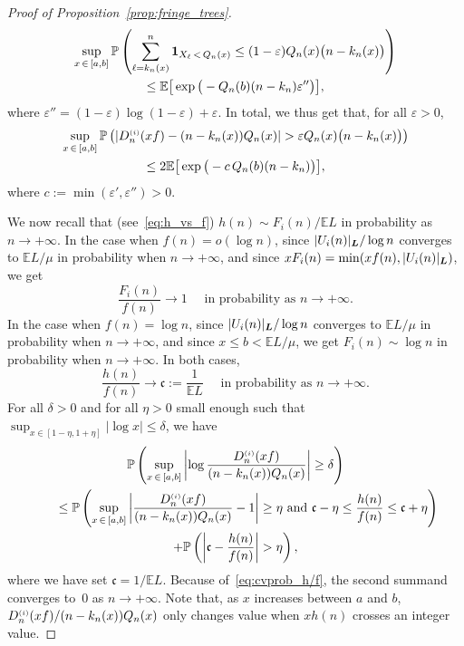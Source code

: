 \documentclass[AHL,Unicode,longabstracts,published]{cedram}
\newcommand{\bs}{\ensuremath{\boldsymbol}}
\newcommand{\sss}{\ensuremath{\scriptscriptstyle}}
\newcommand{\bbP}{\mathbb{P}}
\newcommand{\bbE}{\mathbb{E}}
\newcommand{\frkc}{\mathfrak{c}}
\begin{document}
\begin{proof}[Proof of Proposition~\ref{prop:fringe_trees}]
\begin{multline*}
\sup_{x\,\in\,[a,b]}\bbP\left(\sum_{\ell=k_n(x)}^n \bs1_{X_\ell\,<\,Q_n(x)}\leq (1-\varepsilon)Q_n(x)\big(n-k_n(x)\big)\right)\\
\leq\bbE\big[\exp\big(-Q_n(b)(n-k_n)\varepsilon''\big)\big],
\end{multline*}
where $\varepsilon''=(1-\varepsilon)\log(1-\varepsilon)+\varepsilon.$ In total, we thus get that, for all $\varepsilon>0$,
\begin{multline}\label{eq:LDP}
\sup_{x\,\in\,[a,b]}\bbP\left(\left|D_n^{\sss (i)}(xf)-(n-k_n(x))Q_n(x)\right|>\varepsilon Q_n(x)\big(n-k_n(x)\big)\right) \\
\leq 2\bbE\big[\exp\big(-c\,Q_n(b)(n-k_n)\big)\big],
\end{multline}
where $c:=\min(\varepsilon', \varepsilon'')>0$.

We now recall that (see~\eqref{eq:h_vs_f}) $h(n) \sim F_i(n)/\bbE L$ in probability as $n\to+\infty$. In the case when $f(n) = o(\log n)$, since $|U_i(n)|_{\bs L}/\log n$ converges to {$\bbE L/\mu$} in probability when $n\to+\infty$, and since $xF_i(n) = \min(xf(n), |U_i(n)|_{\bs L})$, we get
\begin{equation}\label{eq:cvprob_Fi/f}
\frac{F_i(n)}{f(n)}\to 1 \quad \text{ in probability as }n\to+\infty.
\end{equation}
In the case when $f(n) = \log n$, since $|U_i(n)|_{\bs L}/\log n$ converges to {$\bbE L/\mu$} in probability when $n\to+\infty$, and since $x\leq b<{\bbE L/\mu}$, we get $F_i(n)\sim \log n$ in probability when $n\to+\infty$. In both cases,
\begin{equation}\label{eq:cvprob_h/f}
\frac{h(n)}{f(n)}\to \frkc := \frac1{\bbE L}\quad \text{ in probability as }n\to+\infty.
\end{equation}
For all $\delta>0$ and for all $\eta>0$ small enough such that $\sup_{x\in [1-\eta, 1+\eta]}|\log x|\leq \delta$, we have
\begin{multline}\label{eq:prob}
\bbP\left(\sup_{x\,\in\,[a,b]}\left|\log \frac{D_n^{\sss (i)}(xf)}{(n-k_n(x))Q_n(x)}\right|\geq\delta\right)\\
\qquad\leq\bbP\left(\sup_{x\,\in\,[a,b]}\left|
\frac{D_n^{\sss (i)}(xf)}{(n-k_n(x))Q_n(x)}-1\right|\geq\eta
\text{ and } \frkc-\eta\leq \frac{h(n)}{f(n)}\leq\frkc+\eta\right)\\
+ \bbP\left(\left|\frkc-\frac{h(n)}{f(n)}\right|>\eta\right),
\end{multline}
where we have set $\frkc = 1/\bbE L$. Because of~\eqref{eq:cvprob_h/f}, the second summand converges to~0 as $n\to+\infty$. Note that, as $x$ increases between $a$ and $b$, ${D_n^{\sss (i)}(xf)}/{(n-k_n(x))Q_n(x)}$ only changes value when $xh(n)$ crosses an integer value.


\end{proof}
\end{document}
